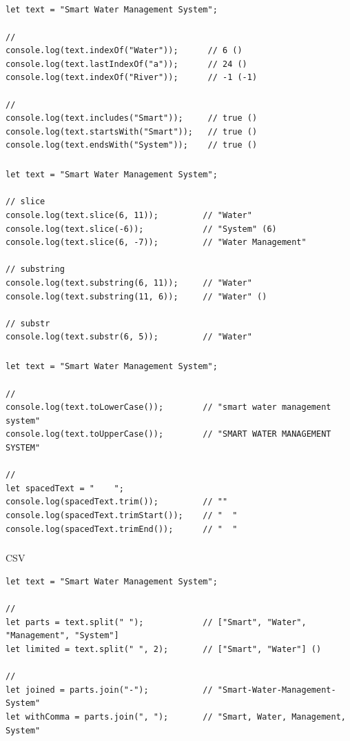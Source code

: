 \hypertarget{section-23}{%
\subparagraph{}\label{section-23}}

\begin{lstlisting}[style=javascript]
let text = "Smart Water Management System";

// 
console.log(text.indexOf("Water"));      // 6 ()
console.log(text.lastIndexOf("a"));      // 24 ()
console.log(text.indexOf("River"));      // -1 (-1)

// 
console.log(text.includes("Smart"));     // true ()
console.log(text.startsWith("Smart"));   // true ()
console.log(text.endsWith("System"));    // true ()
\end{lstlisting}

\hypertarget{section-24}{%
\subparagraph{}\label{section-24}}

\begin{lstlisting}[style=javascript]
let text = "Smart Water Management System";

// slice
console.log(text.slice(6, 11));         // "Water"
console.log(text.slice(-6));            // "System" (6)
console.log(text.slice(6, -7));         // "Water Management"

// substring
console.log(text.substring(6, 11));     // "Water"
console.log(text.substring(11, 6));     // "Water" ()

// substr
console.log(text.substr(6, 5));         // "Water"
\end{lstlisting}

\hypertarget{section-25}{%
\subparagraph{}\label{section-25}}

\begin{lstlisting}[style=javascript]
let text = "Smart Water Management System";

// 
console.log(text.toLowerCase());        // "smart water management system"
console.log(text.toUpperCase());        // "SMART WATER MANAGEMENT SYSTEM"

// 
let spacedText = "    ";
console.log(spacedText.trim());         // ""
console.log(spacedText.trimStart());    // "  "
console.log(spacedText.trimEnd());      // "  "
\end{lstlisting}

\hypertarget{section-26}{%
\subparagraph{}\label{section-26}}

CSV

\begin{lstlisting}[style=javascript]
let text = "Smart Water Management System";

// 
let parts = text.split(" ");            // ["Smart", "Water", "Management", "System"]
let limited = text.split(" ", 2);       // ["Smart", "Water"] ()

// 
let joined = parts.join("-");           // "Smart-Water-Management-System"
let withComma = parts.join(", ");       // "Smart, Water, Management, System"
\end{lstlisting}

